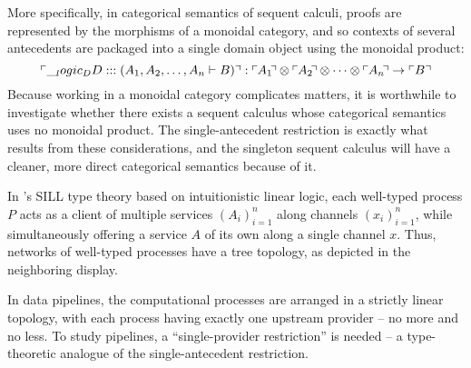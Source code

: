 \begin{description}[parsep=0pt, listparindent=\parindent]
  More specifically, in categorical semantics of sequent calculi, proofs are represented by the morphisms of a monoidal category, and so contexts of several antecedents are packaged into a single domain object using the monoidal product:
  \begin{equation*}
    \ulcorner \DD :: (A_1, A_2, \dotsc, A_n \vdash B) \urcorner :
      \ulcorner\mkern-1mu A_1 \mkern-\thinmuskip\urcorner \otimes \ulcorner\mkern-1mu A_2 \mkern-\thinmuskip\urcorner \otimes \dotsb \otimes \ulcorner\mkern-1mu A_n \mkern-\thinmuskip\urcorner \to \ulcorner B \urcorner
  \end{equation*}
  Because working in a monoidal category complicates matters, it is worthwhile to investigate whether there exists a sequent calculus whose categorical semantics uses no monoidal product.
  The single-antecedent restriction is exactly what results from these considerations, and the singleton sequent calculus will have a cleaner, more direct categorical semantics because of it.

\item[Type theory]
  In \citeauthor{Caires+:MSCS16}'s SILL type theory\autocites{Caires+Pfenning:CONCUR10}{Caires+:TLDI12}{Toninho+:ESOP13}{Caires+:MSCS16} based on intuitionistic linear logic, each well-typed process $P$ acts as a client of multiple services $(A_i)_{i=1}^n$ along channels $(x_i)_{i=1}^n$, while simultaneously offering a service $A$ of its own along a single channel $x$.
  Thus, networks of well-typed processes have a tree topology, as depicted in the neighboring display.%

  In data pipelines, the computational processes are arranged in a strictly linear topology, with each process having exactly one upstream provider -- no more and no less.
  To study pipelines, a \enquote{single-provider restriction} is needed -- a type-theoretic analogue of the single-antecedent restriction.
\end{description}


